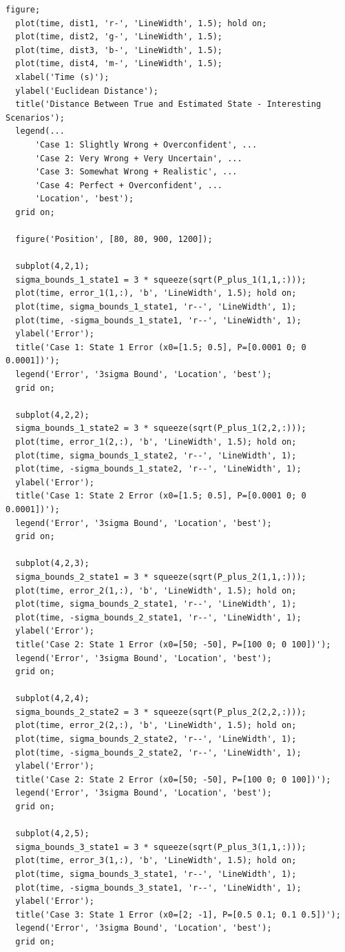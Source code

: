 \documentclass[12pt,A4, onecolumn]{exam}
\begin{document}
\begin{questions}
\begin{lstlisting}[style=matlabstyle]
  figure;
  plot(time, dist1, 'r-', 'LineWidth', 1.5); hold on;
  plot(time, dist2, 'g-', 'LineWidth', 1.5);
  plot(time, dist3, 'b-', 'LineWidth', 1.5);
  plot(time, dist4, 'm-', 'LineWidth', 1.5);
  xlabel('Time (s)');
  ylabel('Euclidean Distance');
  title('Distance Between True and Estimated State - Interesting Scenarios');
  legend(...
      'Case 1: Slightly Wrong + Overconfident', ...
      'Case 2: Very Wrong + Very Uncertain', ...
      'Case 3: Somewhat Wrong + Realistic', ...
      'Case 4: Perfect + Overconfident', ...
      'Location', 'best');
  grid on;

  figure('Position', [80, 80, 900, 1200]);

  subplot(4,2,1);
  sigma_bounds_1_state1 = 3 * squeeze(sqrt(P_plus_1(1,1,:)));
  plot(time, error_1(1,:), 'b', 'LineWidth', 1.5); hold on;
  plot(time, sigma_bounds_1_state1, 'r--', 'LineWidth', 1);
  plot(time, -sigma_bounds_1_state1, 'r--', 'LineWidth', 1);
  ylabel('Error');
  title('Case 1: State 1 Error (x0=[1.5; 0.5], P=[0.0001 0; 0 0.0001])');
  legend('Error', '3sigma Bound', 'Location', 'best');
  grid on;

  subplot(4,2,2);
  sigma_bounds_1_state2 = 3 * squeeze(sqrt(P_plus_1(2,2,:)));
  plot(time, error_1(2,:), 'b', 'LineWidth', 1.5); hold on;
  plot(time, sigma_bounds_1_state2, 'r--', 'LineWidth', 1);
  plot(time, -sigma_bounds_1_state2, 'r--', 'LineWidth', 1);
  ylabel('Error');
  title('Case 1: State 2 Error (x0=[1.5; 0.5], P=[0.0001 0; 0 0.0001])');
  legend('Error', '3sigma Bound', 'Location', 'best');
  grid on;

  subplot(4,2,3);
  sigma_bounds_2_state1 = 3 * squeeze(sqrt(P_plus_2(1,1,:)));
  plot(time, error_2(1,:), 'b', 'LineWidth', 1.5); hold on;
  plot(time, sigma_bounds_2_state1, 'r--', 'LineWidth', 1);
  plot(time, -sigma_bounds_2_state1, 'r--', 'LineWidth', 1);
  ylabel('Error');
  title('Case 2: State 1 Error (x0=[50; -50], P=[100 0; 0 100])');
  legend('Error', '3sigma Bound', 'Location', 'best');
  grid on;

  subplot(4,2,4);
  sigma_bounds_2_state2 = 3 * squeeze(sqrt(P_plus_2(2,2,:)));
  plot(time, error_2(2,:), 'b', 'LineWidth', 1.5); hold on;
  plot(time, sigma_bounds_2_state2, 'r--', 'LineWidth', 1);
  plot(time, -sigma_bounds_2_state2, 'r--', 'LineWidth', 1);
  ylabel('Error');
  title('Case 2: State 2 Error (x0=[50; -50], P=[100 0; 0 100])');
  legend('Error', '3sigma Bound', 'Location', 'best');
  grid on;

  subplot(4,2,5);
  sigma_bounds_3_state1 = 3 * squeeze(sqrt(P_plus_3(1,1,:)));
  plot(time, error_3(1,:), 'b', 'LineWidth', 1.5); hold on;
  plot(time, sigma_bounds_3_state1, 'r--', 'LineWidth', 1);
  plot(time, -sigma_bounds_3_state1, 'r--', 'LineWidth', 1);
  ylabel('Error');
  title('Case 3: State 1 Error (x0=[2; -1], P=[0.5 0.1; 0.1 0.5])');
  legend('Error', '3sigma Bound', 'Location', 'best');
  grid on;



\end{lstlisting}
\end{questions}
\end{document}
